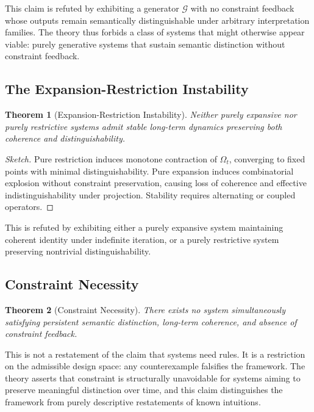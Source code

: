 \documentclass[12pt, a4paper]{article}
\theoremstyle{plain}
\newtheorem{theorem}{Theorem}[section]
\theoremstyle{definition}
\theoremstyle{remark}
\begin{document}
This claim is refuted by exhibiting a generator $\mathcal{G}$ with no constraint feedback whose outputs remain semantically distinguishable under arbitrary interpretation families. The theory thus forbids a class of systems that might otherwise appear viable: purely generative systems that sustain semantic distinction without constraint feedback.

\subsection{The Expansion-Restriction Instability}

\begin{theorem}[Expansion-Restriction Instability]
Neither purely expansive nor purely restrictive systems admit stable long-term dynamics preserving both coherence and distinguishability.
\end{theorem}

\begin{proof}[Sketch]
Pure restriction induces monotone contraction of $\Omega_t$, converging to fixed points with minimal distinguishability. Pure expansion induces combinatorial explosion without constraint preservation, causing loss of coherence and effective indistinguishability under projection. Stability requires alternating or coupled operators.
\end{proof}

This is refuted by exhibiting either a purely expansive system maintaining coherent identity under indefinite iteration, or a purely restrictive system preserving nontrivial distinguishability.

\subsection{Constraint Necessity}

\begin{theorem}[Constraint Necessity]
There exists no system simultaneously satisfying persistent semantic distinction, long-term coherence, and absence of constraint feedback.
\end{theorem}

This is not a restatement of the claim that systems need rules. It is a restriction on the admissible design space: any counterexample falsifies the framework. The theory asserts that constraint is structurally unavoidable for systems aiming to preserve meaningful distinction over time, and this claim distinguishes the framework from purely descriptive restatements of known intuitions.
\end{document}
